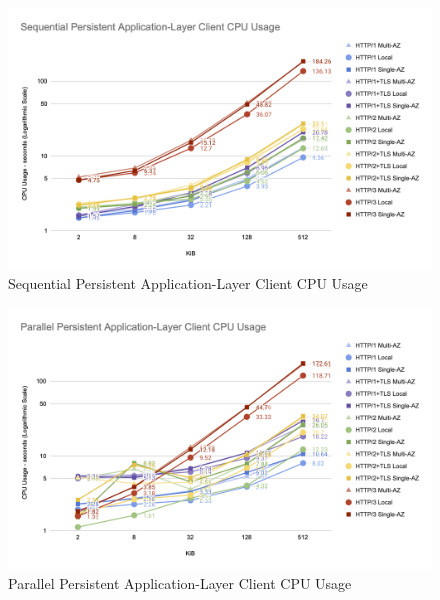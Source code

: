 \begin{figure}[h!]
    \centering
    \includegraphics[width=\linewidth]{figures/charts/Sequential Persistent Application-Layer Client CPU Usage.png}
    \caption{Sequential Persistent Application-Layer Client CPU Usage}
    \label{fig:sequential_client_app_cpu}
\end{figure}
\begin{figure}[h!]
    \centering
    \includegraphics[width=\linewidth]{figures/charts/Parallel Persistent Application-Layer Client CPU Usage.png}
    \caption{Parallel Persistent Application-Layer Client CPU Usage}
    \label{fig:parallel_client_app_cpu}
\end{figure}

